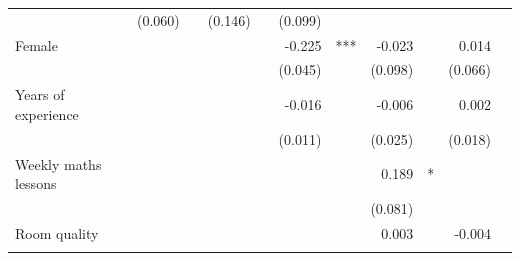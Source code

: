 \documentclass{article}
\begin{document}
\begin{table}[!h]
\begin{tabular}{lllllllllll}
  \multicolumn{1}{l}{} &
  \multicolumn{1}{r}{(0.060)} &
  \multicolumn{1}{l}{} &
  \multicolumn{1}{r}{(0.146)} &
  \multicolumn{1}{l}{} &
  \multicolumn{1}{r}{(0.099)} &
  \multicolumn{1}{l}{} \\
\multicolumn{1}{l}{Female} &
  \multicolumn{1}{r}{} &
  \multicolumn{1}{l}{} &
  \multicolumn{1}{r}{} &
  \multicolumn{1}{l}{} &
  \multicolumn{1}{r}{-0.225} &
  \multicolumn{1}{l}{***} &
  \multicolumn{1}{r}{-0.023} &
  \multicolumn{1}{l}{} &
  \multicolumn{1}{r}{0.014} &
  \multicolumn{1}{l}{} \\
\multicolumn{1}{l}{} &
  \multicolumn{1}{r}{} &
  \multicolumn{1}{l}{} &
  \multicolumn{1}{r}{} &
  \multicolumn{1}{l}{} &
  \multicolumn{1}{r}{(0.045)} &
  \multicolumn{1}{l}{} &
  \multicolumn{1}{r}{(0.098)} &
  \multicolumn{1}{l}{} &
  \multicolumn{1}{r}{(0.066)} &
  \multicolumn{1}{l}{} \\
\multicolumn{1}{l}{Years of experience} &
  \multicolumn{1}{r}{} &
  \multicolumn{1}{l}{} &
  \multicolumn{1}{r}{} &
  \multicolumn{1}{l}{} &
  \multicolumn{1}{r}{-0.016} &
  \multicolumn{1}{l}{} &
  \multicolumn{1}{r}{-0.006} &
  \multicolumn{1}{l}{} &
  \multicolumn{1}{r}{0.002} &
  \multicolumn{1}{l}{} \\
\multicolumn{1}{l}{} &
  \multicolumn{1}{r}{} &
  \multicolumn{1}{l}{} &
  \multicolumn{1}{r}{} &
  \multicolumn{1}{l}{} &
  \multicolumn{1}{r}{(0.011)} &
  \multicolumn{1}{l}{} &
  \multicolumn{1}{r}{(0.025)} &
  \multicolumn{1}{l}{} &
  \multicolumn{1}{r}{(0.018)} &
  \multicolumn{1}{l}{} \\
\multicolumn{1}{l}{Weekly maths lessons} &
  \multicolumn{1}{r}{} &
  \multicolumn{1}{l}{} &
  \multicolumn{1}{r}{} &
  \multicolumn{1}{l}{} &
  \multicolumn{1}{r}{} &
  \multicolumn{1}{l}{} &
  \multicolumn{1}{r}{0.189} &
  \multicolumn{1}{l}{*} &
  \multicolumn{1}{r}{} &
  \multicolumn{1}{l}{} \\
\multicolumn{1}{l}{} &
  \multicolumn{1}{r}{} &
  \multicolumn{1}{l}{} &
  \multicolumn{1}{r}{} &
  \multicolumn{1}{l}{} &
  \multicolumn{1}{r}{} &
  \multicolumn{1}{l}{} &
  \multicolumn{1}{r}{(0.081)} &
  \multicolumn{1}{l}{} &
  \multicolumn{1}{r}{} &
  \multicolumn{1}{l}{} \\
\multicolumn{1}{l}{Room quality} &
  \multicolumn{1}{r}{} &
  \multicolumn{1}{l}{} &
  \multicolumn{1}{r}{} &
  \multicolumn{1}{l}{} &
  \multicolumn{1}{r}{} &
  \multicolumn{1}{l}{} &
  \multicolumn{1}{r}{0.003} &
  \multicolumn{1}{l}{} &
  \multicolumn{1}{r}{-0.004} &
  \multicolumn{1}{l}{} \\
\multicolumn{1}{l}{} &

\end{tabular}
\end{table}
\end{document}
